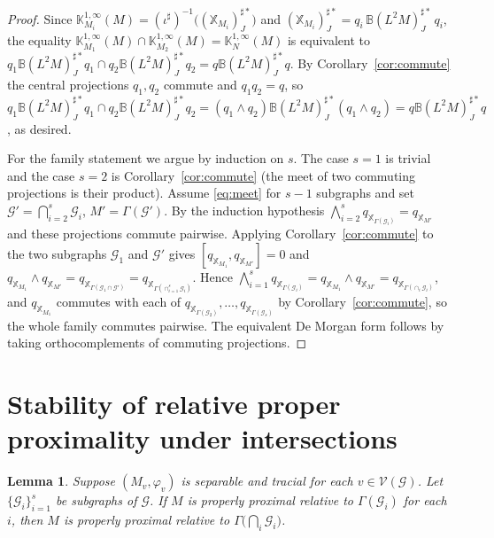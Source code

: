 \documentclass[a4paper, 11pt, reqno]{amsart}
\numberwithin{equation}{section}
\theoremstyle{plain}
\newtheorem{lemma}[thm]{Lemma}
\theoremstyle{remark}
\theoremstyle{definition}
\newcommand{\B}{\mathbb{B}}
\newcommand{\KKK}{{\mathbb K}}
\newcommand{\XX}{{\mathbb{X}}}
\newcommand{\VV}{{\mathcal V}}
\newcommand{\GG}{{\mathcal G}}
\begin{document}
\begin{proof}
Since $\KKK^{1,\infty}_{M_i}(M)=(\iota^\sharp)^{-1}\big((\XX_{M_i})^{\sharp*}_J\big)$ and $(\XX_{M_i})^{\sharp*}_J=q_i\,\B(L^2M)^{\sharp*}_J\,q_i$, the equality $\KKK^{1,\infty}_{M_1}(M)\cap\KKK^{1,\infty}_{M_2}(M)=\KKK^{1,\infty}_{N}(M)$ is equivalent to $q_1\B(L^2M)^{\sharp*}_Jq_1\cap q_2\B(L^2M)^{\sharp*}_Jq_2=q\B(L^2M)^{\sharp*}_Jq$. By Corollary~\ref{cor:commute} the central projections $q_1,q_2$ commute and $q_1q_2=q$, so $q_1\B(L^2M)^{\sharp*}_Jq_1\cap q_2\B(L^2M)^{\sharp*}_Jq_2=(q_1\wedge q_2)\B(L^2M)^{\sharp*}_J(q_1\wedge q_2)=q\B(L^2M)^{\sharp*}_Jq$, as desired.

For the family statement we argue by induction on $s$. The case $s=1$ is trivial and the case $s=2$ is Corollary~\ref{cor:commute} (the meet of two commuting projections is their product). Assume \eqref{eq:meet} for $s-1$ subgraphs and set $\GG'=\bigcap_{i=2}^s\GG_i$, $M'=\Gamma(\GG')$. By the induction hypothesis $\bigwedge_{i=2}^s q_{\XX_{\Gamma(\GG_i)}}=q_{\XX_{M'}}$ and these projections commute pairwise. Applying Corollary~\ref{cor:commute} to the two subgraphs $\GG_1$ and $\GG'$ gives $[q_{\XX_{M_1}},q_{\XX_{M'}}]=0$ and $q_{\XX_{M_1}}\wedge q_{\XX_{M'}}=q_{\XX_{\Gamma(\GG_1\cap\GG')}}=q_{\XX_{\Gamma(\cap_{i=1}^s\GG_i)}}$. Hence $\bigwedge_{i=1}^s q_{\XX_{\Gamma(\GG_i)}}=q_{\XX_{M_1}}\wedge q_{\XX_{M'}}=q_{\XX_{\Gamma(\cap_i\GG_i)}}$, and $q_{\XX_{M_1}}$ commutes with each of $q_{\XX_{\Gamma(\GG_2)}},\dots,q_{\XX_{\Gamma(\GG_s)}}$ by Corollary~\ref{cor:commute}, so the whole family commutes pairwise. The equivalent De Morgan form follows by taking orthocomplements of commuting projections.
\end{proof}

\section{Stability of relative proper proximality under intersections}

\begin{lemma}\label{lem:intersect-pp}
Suppose $(M_v,\varphi_v)$ is separable and tracial for each $v\in\VV(\GG)$. Let $\{\GG_i\}_{i=1}^s$ be subgraphs of $\GG$. If $M$ is properly proximal relative to $\Gamma(\GG_i)$ for each $i$, then $M$ is properly proximal relative to $\Gamma\big(\bigcap_i\GG_i\big)$.
\end{lemma}
\end{document}

